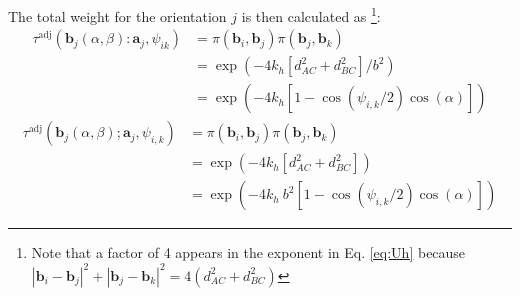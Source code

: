            The total weight for the orientation $j$ is then calculated as \footnote{Note that a factor of 4 appears in the exponent in Eq. \eqref{eq:Uh} because $|{\mathbf b}_i - {\mathbf b}_j|^2 + |{\mathbf b}_j - {\mathbf b}_k|^2 = 4 (d_{AC}^2 + d_{BC}^2)$}:
                    \ifkhExplicitP
                        \begin{equation}
                        \label{eq:Uh}
                            \begin{aligned}
                                \tau^\text{adj} \left( {\mathbf b}_j (\alpha, \beta): \mathbf{a}_j, \psi_{ik} \right)  &= \pi({\mathbf b}_i,{\mathbf b}_j)\pi({\mathbf b}_j,{\mathbf b}_k)\\
                                &= \exp\left(-4 k_h [d_{AC}^2 + d_{BC}^2]/b^2\right)\\
                                &= \exp\left(-4 k_h [1 - \cos(\psi_{i,k}/2) \cos(\alpha)]\right)
                            \end{aligned}
                        \end{equation}
                    \else
                        \begin{equation}
                        \label{eq:Uh}
                            \begin{aligned}
                                \tau^\text{adj} \left( {\mathbf b}_j (\alpha, \beta); \mathbf{a}_j, \psi_{i,k} \right)  &= \pi({\mathbf b}_i,{\mathbf b}_j)\pi({\mathbf b}_j,{\mathbf b}_k)\\
                                &= \exp\left(-4 k_h [d_{AC}^2 + d_{BC}^2]\right)\\
                                &= \exp\left(-4k_h~b^2 [1 - \cos(\psi_{i,k}/2) \cos(\alpha)]\right)
                            \end{aligned}
                        \end{equation}
                    \fi

